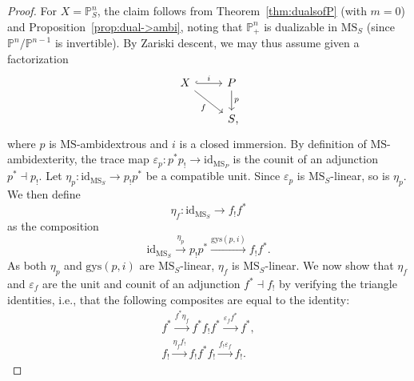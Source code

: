 \documentclass{amsart}
\numberwithin{equation}{section}
\theoremstyle{plain}
\theoremstyle{definition}
\let\bb=\mathbb
\def\P{\bb P}
\def\id{\mathrm{id}}
\def\MS{\mathrm{MS}}
\let\epsilon=\varepsilon
\begin{document}
\begin{proof}
	For $X=\P^n_S$, the claim follows from Theorem~\ref{thm:dualsofP} (with $m=0$) and Proposition~\ref{prop:dual->ambi}, noting that $\P^n_+$ is dualizable in $\MS_S$ (since $\P^n/\P^{n-1}$ is invertible).
	By Zariski descent, we may thus assume given a factorization
	\[
	\begin{tikzcd}
		X \ar[hook]{r}{i} \ar{dr}[swap]{f} & P \ar{d}{p} \\ 
		& S\rlap,
	\end{tikzcd}
	\]
	where $p$ is $\MS$-ambidextrous and $i$ is a closed immersion. 
	By definition of $\MS$-ambidexterity, the trace map $\epsilon_p\colon p^*p_!\to\id_{\MS_P}$ is the counit of an adjunction $p^*\dashv p_!$.
	Let $\eta_p\colon \id_{\MS_S}\to p_!p^*$ be a compatible unit. Since $\epsilon_p$ is $\MS_S$-linear, so is $\eta_p$.
	We then define
	\[
	\eta_f\colon \id_{\MS_S} \to f_!f^*
	\]
	as the composition
	\[
	\id_{\MS_S}\xrightarrow{\eta_p} p_!p^*\xrightarrow{\mathrm{gys}(p,i)} f_!f^*.
	\]
	As both $\eta_p$ and $\mathrm{gys}(p,i)$ are $\MS_S$-linear, $\eta_f$ is $\MS_S$-linear.
	We now show that $\eta_f$ and $\epsilon_f$ are the unit and counit of an adjunction $f^*\dashv f_!$ by verifying the triangle identities, i.e., that the following composites are equal to the identity:
	\begin{gather}
		\label{eqn:triangle-1} f^* \xrightarrow{f^*\eta_f} f^*f_!f^* \xrightarrow{\epsilon_f f^*} f^*, \\
		\label{eqn:triangle-2} f_! \xrightarrow{\eta_ff_!} f_!f^*f_! \xrightarrow{f_!\epsilon_f} f_!.
	\end{gather}
	

\end{proof}
\end{document}
